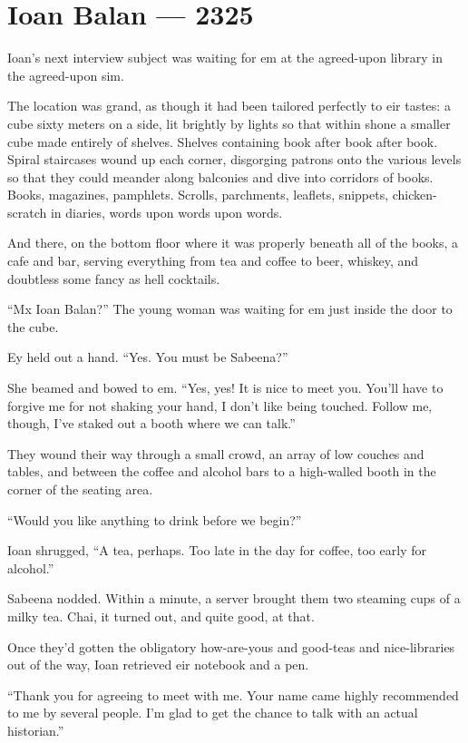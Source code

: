 \hypertarget{ioan-balan-2325}{%
\chapter{Ioan Balan — 2325}\label{ioan-balan-2325}}

Ioan's next interview subject was waiting for em at the agreed-upon library in the agreed-upon sim.

The location was grand, as though it had been tailored perfectly to eir tastes: a cube sixty meters on a side, lit brightly by lights so that within shone a smaller cube made entirely of shelves. Shelves containing book after book after book. Spiral staircases wound up each corner, disgorging patrons onto the various levels so that they could meander along balconies and dive into corridors of books. Books, magazines, pamphlets. Scrolls, parchments, leaflets, snippets, chicken-scratch in diaries, words upon words upon words.

And there, on the bottom floor where it was properly beneath all of the books, a cafe and bar, serving everything from tea and coffee to beer, whiskey, and doubtless some fancy as hell cocktails.

``Mx Ioan Balan?'' The young woman was waiting for em just inside the door to the cube.

Ey held out a hand. ``Yes. You must be Sabeena?''

She beamed and bowed to em. ``Yes, yes! It is nice to meet you. You'll have to forgive me for not shaking your hand, I don't like being touched. Follow me, though, I've staked out a booth where we can talk.''

They wound their way through a small crowd, an array of low couches and tables, and between the coffee and alcohol bars to a high-walled booth in the corner of the seating area.

``Would you like anything to drink before we begin?''

Ioan shrugged, ``A tea, perhaps. Too late in the day for coffee, too early for alcohol.''

Sabeena nodded. Within a minute, a server brought them two steaming cups of a milky tea. Chai, it turned out, and quite good, at that.

Once they'd gotten the obligatory how-are-yous and good-teas and nice-libraries out of the way, Ioan retrieved eir notebook and a pen.

``Thank you for agreeing to meet with me. Your name came highly recommended to me by several people. I'm glad to get the chance to talk with an actual historian.''

